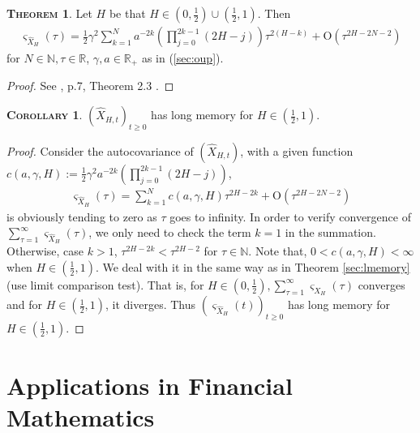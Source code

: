 \documentclass[a4paper, twoside, 11pt]{article}
\theoremstyle{definition}
\newtheorem{theorem}[definition]{\scshape Theorem}
\newtheorem{corollary}[definition]{\scshape Corollary}
\newcommand{\brkt}[1]{\left({#1} \right)}
\begin{document}
  \begin{theorem}
	Let $H$ be that $H\in (0, \frac{1}{2}) \cup (\frac{1}{2}, 1)$. Then
	\begin{eqnarray*}
	  \varsigma_{\hat{X}_{H}}(\tau) = \frac{1}{2} \gamma^2 \sum_{k=1}^{N} a^{-2k}\brkt{\prod_{j=0}^{2k-1}(2H-j)}\tau^{2(H-k)} + \mathrm{O}(\tau^{2H-2N-2})
  \end{eqnarray*}
  for $N \in \mathbb{N}, \tau\in\mathbb{R}$, $\gamma, a \in \mathbb{R}_+$ as in (\ref{sec:oup}).
	\label{sec:autocov}
  \end{theorem}
  \begin{proof}
	See \cite{chriel}, p.7, Theorem 2.3 .
  \end{proof}

  \begin{corollary}
	$(\hat{X}_{H,t})_{t\ge 0}$ has long memory for $H\in (\frac{1}{2}, 1)$.
	\label{sec:longmer}
  \end{corollary}
  \begin{proof}
	Consider the autocovariance of $(\hat{X}_{H,t})$, with a given function \\$c(a, \gamma, H):= \frac{1}{2} \gamma^2 a^{-2k}\brkt{\prod_{j=0}^{2k-1}(2H-j)}$,
	\begin{eqnarray*}
	  \varsigma_{\hat{X}_{H}}(\tau) = \sum_{k=1}^N c(a, \gamma,  H) \tau^{2H-2k} + \mathrm{O}(\tau^{{2H-2N-2}})
	\end{eqnarray*}
	is obviously tending to zero as $\tau$ goes to infinity. In order to verify convergence of $\sum_{\tau=1}^{\infty} \varsigma_{\hat{X}_{H}}(\tau)$, we only need to check the term $k=1$ in the summation. Otherwise, case $k>1$, $\tau^{2H-2k} < \tau^{2H-2}$ for $\tau\in\mathbb{N}$. Note that, $0 <c(a, \gamma, H) < \infty$ when $H\in(\frac{1}{2}, 1)$. We deal with it in the same way as in Theorem \ref{sec:lmemory} (use limit comparison test). That is, for $H\in (0, \frac{1}{2}), \sum_{\tau=1}^{\infty} \varsigma_{X_{H}}(\tau)$ converges and for $H\in (\frac{1}{2}, 1)$, it diverges. Thus $(\varsigma_{\hat{X}_{H}}(t))_{t\ge 0}$ has long memory for $H\in(\frac{1}{2}, 1)$.
  \end{proof}
  \newpage

  \section{Applications in Financial Mathematics}
  \setcounter{equation}{0}
\end{document}
